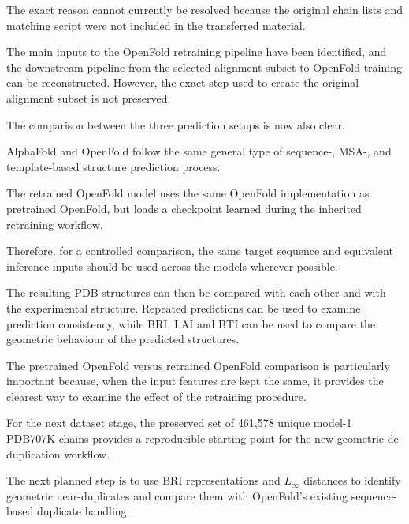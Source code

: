 \documentclass[11pt,a4paper]{article}
\begin{document}
The exact reason cannot currently be resolved because the original chain lists and matching script were not included in the transferred material.

The main inputs to the OpenFold retraining pipeline have been identified, and the downstream pipeline from the selected alignment subset to OpenFold training can be reconstructed. However, the exact step used to create the original alignment subset is not preserved.

The comparison between the three prediction setups is now also clear.

AlphaFold and OpenFold follow the same general type of sequence-, MSA-, and template-based structure prediction process.

The retrained OpenFold model uses the same OpenFold implementation as pretrained OpenFold, but loads a checkpoint learned during the inherited retraining workflow.

Therefore, for a controlled comparison, the same target sequence and equivalent inference inputs should be used across the models wherever possible.

The resulting PDB structures can then be compared with each other and with the experimental structure. Repeated predictions can be used to examine prediction consistency, while BRI, LAI and BTI can be used to compare the geometric behaviour of the predicted structures.

The pretrained OpenFold versus retrained OpenFold comparison is particularly important because, when the input features are kept the same, it provides the clearest way to examine the effect of the retraining procedure.

For the next dataset stage, the preserved set of 461,578 unique model-1 PDB707K chains provides a reproducible starting point for the new geometric de-duplication workflow.

The next planned step is to use BRI representations and $L_{\infty}$ distances to identify geometric near-duplicates and compare them with OpenFold's existing sequence-based duplicate handling.
\end{document}
